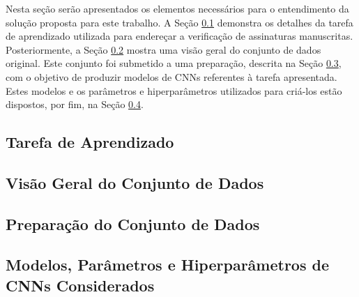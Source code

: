 
Nesta seção serão apresentados os elementos necessários para o entendimento da solução proposta para este trabalho. A Seção \ref{sec:tarefa} demonstra os detalhes da tarefa de aprendizado utilizada para endereçar a verificação de assinaturas manuscritas. Posteriormente, a Seção \ref{sec:visaogeral} mostra uma visão geral do conjunto de dados original. Este conjunto foi submetido a uma preparação, descrita na Seção \ref{sec:preparacao}, com o objetivo de produzir modelos de CNNs referentes à tarefa apresentada. Estes modelos e os parâmetros e hiperparâmetros utilizados para criá-los estão dispostos, por fim, na Seção \ref{sec:modelos}.

\subsection{Tarefa de Aprendizado}

\label{sec:tarefa}

\subsection{Visão Geral do Conjunto de Dados}

\label{sec:visaogeral}

\subsection{Preparação do Conjunto de Dados}

\label{sec:preparacao}

\subsection{Modelos, Parâmetros e Hiperparâmetros de CNNs Considerados}

\label{sec:modelos}
